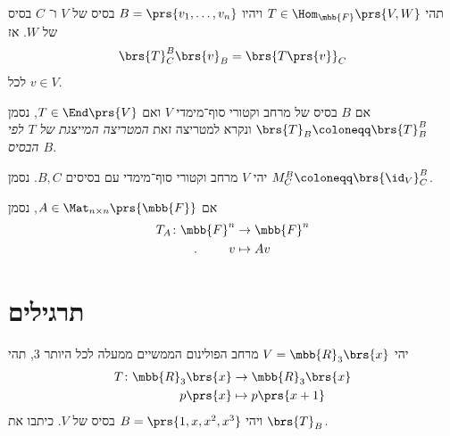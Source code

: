 \documentclass[a4paper,10pt,twoside,openany]{book}
\begin{document}
\begin{proposition}
תהי
$T \in \Hom_{\mbb{F}}\prs{V,W}$
ויהיו
$B = \prs{v_1, \ldots, v_n}$
בסיס של
$V$
ו־%
$C$
בסיס של
$W$.
אז
\[\brs{T}^B_C \brs{v}_B = \brs{T\prs{v}}_C\]
לכל
$v \in V$.
\end{proposition}

\begin{notation}
אם
$B$
בסיס של מרחב וקטורי סוף־מימדי
$V$
ואם
$T \in \End\prs{V}$,
נסמן
$\brs{T}_B \coloneqq \brs{T}^B_B$
ונקרא למטריצה זאת
\emph{המטריצה המייצגת של
$T$
לפי הבסיס
$B$}.
\end{notation}

\begin{notation}
יהי
$V$
מרחב וקטורי סוף־מימדי עם בסיסים
$B,C$.
נסמן
$M^B_C \coloneqq \brs{\id_V}^B_C$.
\end{notation}

\begin{notation}
אם
$A \in \Mat_{n\times n}\prs{\mbb{F}}$,
נסמן
\begin{align*}
T_A \colon \mbb{F}^n &\to \mbb{F}^n \\
\text{.} \hphantom{lalala} v &\mapsto Av
\end{align*}
\end{notation}

\section{תרגילים}

\begin{exercisechap}\label{ex:p(x+1)}
יהי
$V = \mbb{R}_3\brs{x}$
מרחב הפולינום הממשיים ממעלה לכל היותר
$3$,
תהי
\begin{align*}
T \colon \mbb{R}_3\brs{x} &\to \mbb{R}_3\brs{x} \\
p\prs{x} &\mapsto p\prs{x+1}
\end{align*}
ויהי
$B = \prs{1,x,x^2,x^3}$
בסיס של
$V$.
כיתבו את
$\brs{T}_B$.
\end{exercisechap}
\end{document}
